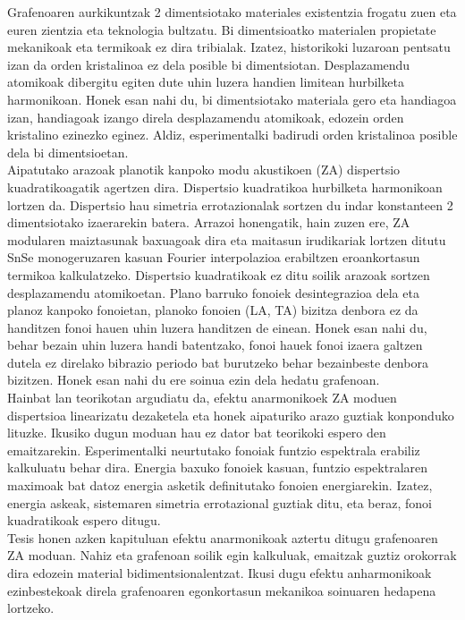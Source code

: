 Grafenoaren aurkikuntzak 2 dimentsiotako materiales existentzia frogatu zuen eta euren zientzia eta teknologia 
bultzatu. Bi dimentsioatko materialen propietate mekanikoak eta termikoak ez dira tribialak. Izatez, historikoki 
luzaroan pentsatu izan da orden kristalinoa ez dela posible bi dimentsiotan. Desplazamendu atomikoak dibergitu 
egiten dute uhin luzera handien limitean hurbilketa harmonikoan. Honek esan nahi du, bi dimentsiotako materiala gero 
eta handiagoa izan, handiagoak izango direla desplazamendu atomikoak, edozein orden kristalino ezinezko eginez. 
Aldiz, esperimentalki badirudi orden kristalinoa posible dela bi dimentsioetan. \\

Aipatutako arazoak planotik kanpoko modu akustikoen (ZA) dispertsio kuadratikoagatik agertzen dira. Dispertsio 
kuadratikoa hurbilketa harmonikoan lortzen da. Dispertsio hau simetria errotazionalak sortzen du indar konstanteen 
2 dimentsiotako izaerarekin batera. Arrazoi honengatik, hain zuzen ere, ZA modularen maiztasunak baxuagoak dira eta 
maitasun irudikariak lortzen ditutu SnSe monogeruzaren kasuan Fourier interpolazioa erabiltzen eroankortasun termikoa 
kalkulatzeko. Dispertsio kuadratikoak ez ditu soilik arazoak sortzen desplazamendu atomikoetan. 
Plano barruko fonoiek desintegrazioa dela eta planoz kanpoko fonoietan, planoko fonoien (LA, TA) bizitza denbora ez 
da handitzen fonoi hauen uhin luzera handitzen de einean. Honek esan nahi du, behar bezain uhin luzera handi 
batentzako, fonoi hauek fonoi izaera galtzen dutela ez direlako bibrazio periodo bat burutzeko behar bezainbeste 
denbora bizitzen. Honek esan nahi du ere soinua ezin dela hedatu grafenoan. \\

Hainbat lan teorikotan argudiatu da, efektu anarmonikoek ZA moduen dispertsioa linearizatu dezaketela eta honek 
aipaturiko arazo guztiak konponduko lituzke. Ikusiko dugun moduan hau ez dator bat teorikoki espero den 
emaitzarekin. Esperimentalki neurtutako fonoiak funtzio espektrala erabiliz kalkuluatu behar dira. Energia baxuko 
fonoiek kasuan, funtzio espektralaren maximoak bat datoz energia asketik definitutako fonoien energiarekin. Izatez, 
energia askeak, sistemaren simetria errotazional guztiak ditu, eta beraz, fonoi kuadratikoak espero ditugu. \\

Tesis honen azken kapituluan efektu anarmonikoak aztertu ditugu grafenoaren ZA moduan. Nahiz eta grafenoan soilik 
egin kalkuluak, emaitzak guztiz orokorrak dira edozein material bidimentsionalentzat. Ikusi dugu efektu anharmonikoak 
ezinbestekoak direla grafenoaren egonkortasun mekanikoa soinuaren hedapena lortzeko. 
